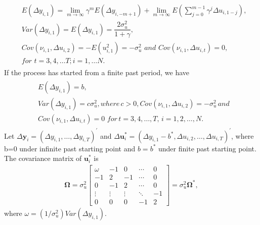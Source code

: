 \documentclass[12pt,a4paper,hyperref]{article}
\begin{document}
\begin{align}
\begin{split}
&E \left( \Delta y_{i,1} \right)=
\lim_{m\rightarrow \infty}\gamma^{m} E\left( \Delta y_{i , -m+1}   \right)+\lim_{m \rightarrow \infty} E\left( \sum^{m-1}_{j=0}\gamma^{j} \Delta u_{i , 1-j} \right),  \\
& Var \left( \Delta y_{i,1} \right)=E \left( \Delta y_{i,1} \right)= \dfrac{2 \sigma^{2}_{u}}{1+\gamma}, \\
&Cov \left( \nu_{i,1}, \Delta u_{i,2}  \right)= -E \left(u_{i,1}^{2} \right)=- \sigma_{u}^{2} \,\,and \,\,Cov \left( \nu_{i,1}, \Delta u_{i,t} \right)=0, \\
&for \,\,t=3,4,\ldots T; i=1,\ldots N.
\end{split}
\end{align}
If the process  has started  from a  finite past  period, we  have
\begin{align}
\begin{split}
& E \left( \Delta y_{i,1} \right)=b, \\
 &Var \left( \Delta y_{i,1} \right)=c \sigma^{2}_{u}, where \, c > 0, Cov \left( \nu_{i,1}, \Delta u_{i,2} \right)= -\sigma^{2}_{u} \,and \, \\
&Cov \left( \nu_{i,1}, \Delta u_{i,t} \right)=0 \,\, for \,t=3,4,\ldots, T, \, i=1,2,\ldots, N.
\end{split}
\end{align}
Let $\Delta \boldsymbol{y}_{i}=\left( \Delta y_{i,1},\ldots, \Delta y_{i,T}  \right)^{'}$ and $\Delta \boldsymbol{u}_{i}^{\ast}= \left( \Delta y_{i,1}-b^{\ast}, \Delta u_{i,2},\ldots, \Delta u_{i,T}\right)^{'}$, where b=0 under infinite past starting point  and $b=b^{\ast}$ under finite past starting point.
The covariance matrix of $\boldsymbol{u}_{i}^{\ast}$ is
 \begin{align}
   \boldsymbol{\Omega}= \sigma^{2}_{u}
\begin{bmatrix}
 \omega & -1     & 0      &   \cdots   & 0  \\
 -1     & 2      & -1     &    \cdots  &  0   \\
  0     & -1     &  2     &     \cdots &  0   \\
\vdots  & \vdots & \vdots & \ddots     & -1 \\
0       &  0     & 0      & -1         & 2
\end{bmatrix}
=\sigma^{2}_{u}  \boldsymbol{\Omega}^{*},
\end{align}
where $\omega=\left( 1/\sigma^{2}_{u} \right) Var\left(\Delta y_{i,1} \right)$.
\end{document}
